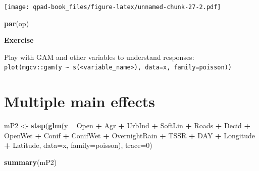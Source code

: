 \documentclass[12pt,]{book}
\newenvironment{Shaded}{\begin{snugshade}}{\end{snugshade}}
\newcommand{\DataTypeTok}[1]{\textcolor[rgb]{0.13,0.29,0.53}{#1}}
\newcommand{\DecValTok}[1]{\textcolor[rgb]{0.00,0.00,0.81}{#1}}
\newcommand{\FloatTok}[1]{\textcolor[rgb]{0.00,0.00,0.81}{#1}}
\newcommand{\KeywordTok}[1]{\textcolor[rgb]{0.13,0.29,0.53}{\textbf{#1}}}
\newcommand{\NormalTok}[1]{#1}
\newcommand{\OperatorTok}[1]{\textcolor[rgb]{0.81,0.36,0.00}{\textbf{#1}}}
\newcommand{\StringTok}[1]{\textcolor[rgb]{0.31,0.60,0.02}{#1}}
\let\BeginKnitrBlock\begin \let\EndKnitrBlock\end
\begin{document}
\begin{Shaded}
\end{Shaded}

\texttt{[image: qpad-book\_files/figure-latex/unnamed-chunk-27-2.pdf]}

\begin{Shaded}
\begin{Highlighting}[]
\KeywordTok{par}\NormalTok{(op)}
\end{Highlighting}
\end{Shaded}

\BeginKnitrBlock{rmdexercise}
\textbf{Exercise}

Play with GAM and other variables to understand responses:
\texttt{plot(mgcv::gam(y\ \textasciitilde{}\ s(\textless{}variable\_name\textgreater{}),\ data=x,\ family=poisson))}
\EndKnitrBlock{rmdexercise}

\hypertarget{multiple-main-effects}{%
\section{Multiple main effects}\label{multiple-main-effects}}

\begin{Shaded}
\begin{Highlighting}[]
\NormalTok{mP2 <-}\StringTok{ }\KeywordTok{step}\NormalTok{(}\KeywordTok{glm}\NormalTok{(y }\OperatorTok{~}\StringTok{ }\NormalTok{Open }\OperatorTok{+}\StringTok{ }\NormalTok{Agr }\OperatorTok{+}\StringTok{ }\NormalTok{UrbInd }\OperatorTok{+}\StringTok{ }\NormalTok{SoftLin }\OperatorTok{+}\StringTok{ }\NormalTok{Roads }\OperatorTok{+}\StringTok{ }
\StringTok{  }\NormalTok{Decid }\OperatorTok{+}\StringTok{ }\NormalTok{OpenWet }\OperatorTok{+}\StringTok{ }\NormalTok{Conif }\OperatorTok{+}\StringTok{ }\NormalTok{ConifWet }\OperatorTok{+}\StringTok{ }
\StringTok{  }\NormalTok{OvernightRain }\OperatorTok{+}\StringTok{ }\NormalTok{TSSR }\OperatorTok{+}\StringTok{ }\NormalTok{DAY }\OperatorTok{+}\StringTok{ }\NormalTok{Longitude }\OperatorTok{+}\StringTok{ }\NormalTok{Latitude,}
  \DataTypeTok{data=}\NormalTok{x, }\DataTypeTok{family=}\NormalTok{poisson), }\DataTypeTok{trace=}\DecValTok{0}\NormalTok{)}

\KeywordTok{summary}\NormalTok{(mP2)}
\end{Highlighting}
\end{Shaded}
\end{document}
